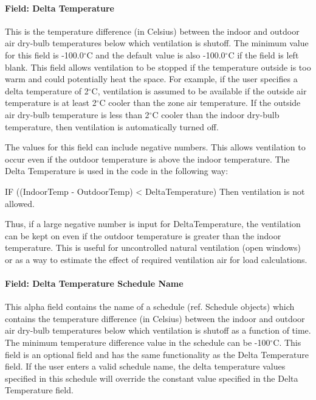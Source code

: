 \paragraph{Field: Delta Temperature}\label{field-delta-temperature-1}

This is the temperature difference (in Celsius) between the indoor and outdoor air dry-bulb temperatures below which ventilation is shutoff. The minimum value for this field is -100.0$^\circ$C and the default value is also -100.0$^\circ$C if the field is left blank. This field allows ventilation to be stopped if the temperature outside is too warm and could potentially heat the space. For example, if the user specifies a delta temperature of 2$^\circ$C, ventilation is assumed to be available if the outside air temperature is at least 2$^\circ$C cooler than the zone air temperature. If the outside air dry-bulb temperature is less than 2$^\circ$C cooler than the indoor dry-bulb temperature, then ventilation is automatically turned off.

The values for this field can include negative numbers. This allows ventilation to occur even if the outdoor temperature is above the indoor temperature. The Delta Temperature is used in the code in the following way:

IF ((IndoorTemp - OutdoorTemp) \textless{} DeltaTemperature) Then ventilation is not allowed.

Thus, if a large negative number is input for DeltaTemperature, the ventilation can be kept on even if the outdoor temperature is greater than the indoor temperature. This is useful for uncontrolled natural ventilation (open windows) or as a way to estimate the effect of required ventilation air for load calculations.

\paragraph{Field: Delta Temperature Schedule Name}\label{field-delta-temperature-schedule-name-1}

This alpha field contains the name of a schedule (ref. Schedule objects) which contains the temperature difference (in Celsius) between the indoor and outdoor air dry-bulb temperatures below which ventilation is shutoff as a function of time. The minimum temperature difference value in the schedule can be -100$^\circ$C. This field is an optional field and has the same functionality as the Delta Temperature field. If the user enters a valid schedule name, the delta temperature values specified in this schedule will override the constant value specified in the Delta Temperature field.

